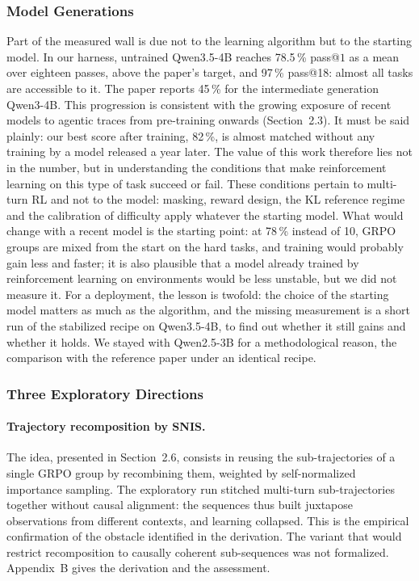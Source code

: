 \documentclass[11pt,a4paper]{article}
\begin{document}
\subsubsection{Model Generations}

Part of the measured wall is due not to the learning algorithm but to the starting model. In our harness, untrained Qwen3.5-4B reaches 78.5\,\% pass@$1$ as a mean over eighteen passes, above the paper's target, and 97\,\% pass@18: almost all tasks are accessible to it. The paper reports 45\,\% for the intermediate generation Qwen3-4B. This progression is consistent with the growing exposure of recent models to agentic traces from pre-training onwards (Section~2.3). It must be said plainly: our best score after training, 82\,\%, is almost matched without any training by a model released a year later. The value of this work therefore lies not in the number, but in understanding the conditions that make reinforcement learning on this type of task succeed or fail. These conditions pertain to multi-turn RL and not to the model: masking, reward design, the KL reference regime and the calibration of difficulty apply whatever the starting model. What would change with a recent model is the starting point: at 78\,\% instead of 10, GRPO groups are mixed from the start on the hard tasks, and training would probably gain less and faster; it is also plausible that a model already trained by reinforcement learning on environments would be less unstable, but we did not measure it. For a deployment, the lesson is twofold: the choice of the starting model matters as much as the algorithm, and the missing measurement is a short run of the stabilized recipe on Qwen3.5-4B, to find out whether it still gains and whether it holds. We stayed with Qwen2.5-3B for a methodological reason, the comparison with the reference paper under an identical recipe.


\subsubsection{Three Exploratory Directions}

\paragraph{Trajectory recomposition by SNIS.} The idea, presented in Section~2.6, consists in reusing the sub-trajectories of a single GRPO group by recombining them, weighted by self-normalized importance sampling. The exploratory run stitched multi-turn sub-trajectories together without causal alignment: the sequences thus built juxtapose observations from different contexts, and learning collapsed. This is the empirical confirmation of the obstacle identified in the derivation. The variant that would restrict recomposition to causally coherent sub-sequences was not formalized. Appendix~B gives the derivation and the assessment.
\end{document}
